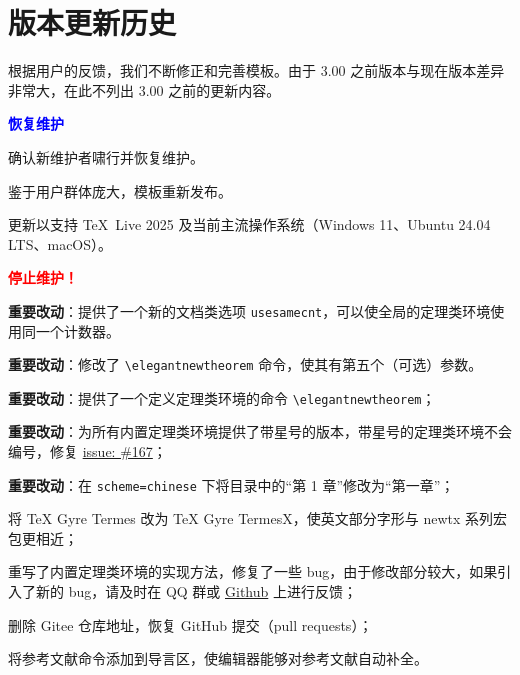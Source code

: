 \documentclass[lang=cn,newtx,10pt,scheme=chinese]{elegantbook}
\begin{document}
\chapter{版本更新历史}

根据用户的反馈，我们不断修正和完善模板。由于 3.00 之前版本与现在版本差异非常大，在此不列出 3.00 之前的更新内容。

  \textcolor{blue}{\bfseries 恢复维护}

\begin{change}
  \item 确认新维护者啸行并恢复维护。
  \item 鉴于用户群体庞大，模板重新发布。
  \item 更新以支持 \TeX~Live 2025 及当前主流操作系统（Windows 11、Ubuntu 24.04 LTS、macOS）。
\end{change}

 \textcolor{red}{\bfseries 停止维护！}

\begin{change}
  \item \textbf{重要改动}：提供了一个新的文档类选项 \lstinline|usesamecnt|，可以使全局的定理类环境使用同一个计数器。
  \item \textbf{重要改动}：修改了 \lstinline|\elegantnewtheorem| 命令，使其有第五个（可选）参数。
\end{change}


\begin{change}
  \item \textbf{重要改动}：提供了一个定义定理类环境的命令 \lstinline|\elegantnewtheorem|；
  \item \textbf{重要改动}：为所有内置定理类环境提供了带星号的版本，带星号的定理类环境不会编号，修复 \href{https://github.com/ElegantLaTeX/ElegantBook/issues/167}{issue: \#167}；
  \item \textbf{重要改动}：在 \lstinline{scheme=chinese} 下将目录中的“第 1 章”修改为“第一章”；
  \item 将 TeX Gyre Termes 改为 TeX Gyre TermesX，使英文部分字形与 newtx 系列宏包更相近；
  \item 重写了内置定理类环境的实现方法，修复了一些 bug，由于修改部分较大，如果引入了新的 bug，请及时在 QQ 群或 \href{https://github.com/ElegantLaTeX}{Github} 上进行反馈；
  \item 删除 Gitee 仓库地址，恢复 GitHub 提交（pull requests）；
  \item 将参考文献命令添加到导言区，使编辑器能够对参考文献自动补全。
\end{change}
\end{document}
